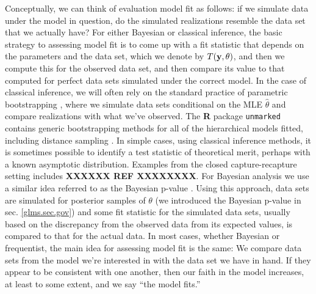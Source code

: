 Conceptually, we can think of evaluation model fit as follows: if we
simulate data under the model in question, do the simulated realizations resemble
the data set that we actually have? 
For either Bayesian or classical inference, the basic strategy to
assessing model fit is to come up with a fit statistic that depends on
the parameters and the data set, which we denote by $T({\bf y},
\theta)$, and then we compute this for the observed data set, and then
compare its value to that computed for perfect data sets simulated
under the correct model.  In the case of classical inference, we will
often rely on the standard practice of parametric bootstrapping
\citep{dixon:2002}, where we simulate data sets conditional on the MLE
$\hat{\theta}$ and compare realizations with what we've observed.
The {\bf R} package \mbox{\tt unmarked}
\citep{fiske_chandler:2011} contains generic bootstrapping methods for
all of the hierarchical models fitted, including distance sampling
\citep[e.g., see][for an application]{sillett_etal:2012}.  
  In
simple cases, using classical inference methods, it is sometimes
possible to identify a test statistic of theoretical merit, perhaps
with a known asymptotic distribution.  Examples from the closed
capture-recapture setting includes {\bf XXXXXX REF XXXXXXXX}.  For Bayesian
analysis we use a similar idea referred to as the Bayesian p-value
\citep{gelman_etal:2006}. Using this approach, data sets are simulated
for posterior samples of $\theta$ (we introduced the Bayesian
p-value in sec. \ref{glms.sec.gov}) and some fit statistic for the
simulated data sets, usually based on the discrepancy from the
observed data from its expected values, is compared to that for the
actual data.  In most cases, whether Bayesian or frequentist, the main idea for
assessing model fit is the same: We compare data sets from the model
we're interested in with the data set we have in hand. If they appear
to be consistent with one another, then our faith in the model
increases,  at least to some extent, and we say ``the model fits.''

